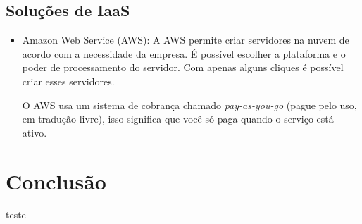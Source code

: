 \documentclass{abnt}
\begin{document}
	\section{Soluções de IaaS}

		\begin{itemize}
			\item Amazon Web Service (AWS): A AWS permite criar servidores na nuvem de acordo com a necessidade da empresa. É possível escolher a plataforma e o poder de processamento do servidor. Com apenas alguns cliques é possível criar esses servidores. 
			
			O AWS usa um sistema de cobrança chamado \textit{pay-as-you-go} (pague pelo uso, em tradução livre), isso significa que você só paga quando o serviço está ativo.
		\end{itemize}
	\chapter{Conclusão}
		teste
\end{document}
